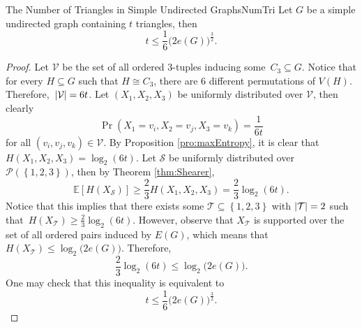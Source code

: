 \documentclass[math]{amznotes}
\theoremstyle{remark}
\begin{document}
\begin{probox}{The Number of Triangles in Simple Undirected Graphs}{NumTri}
    Let $G$ be a simple undirected graph containing $t$ triangles, then 
    \begin{equation*}
        t \leq \frac{1}{6}\bigl(2e\left(G\right)\bigr)^{\frac{3}{2}}.
    \end{equation*}
    \tcblower
    \begin{proof}
        Let $\mathcal{V}$ be the set of all ordered $3$-tuples inducing some~$C_3 \subseteq G$. Notice that for every $H \subseteq G$ such that $H \cong C_3$, there are $6$ different permutations of $V\left(H\right)$. Therefore,~${\left\lvert {\mathcal{V}} \right\rvert} = 6t$. Let $\left(X_1, X_2, X_3\right)$ be uniformly distributed over $\mathcal{V}$, then clearly 
        \begin{equation*}
            \Pr\left(X_1 = v_i, X_2 = v_j, X_3 = v_k\right) = \frac{1}{6t}
        \end{equation*}
        for all $\left(v_i, v_j, v_k\right) \in \mathcal{V}$. By Proposition \ref{pro:maxEntropy}, it is clear that $H\left(X_1, X_2, X_3\right) = \log_2\left(6t\right)$. Let $\mathcal{S}$ be uniformly distributed over $\mathcal{P}\left(\left\{1, 2, 3\right\}\right)$, then by Theorem \ref{thm:Shearer}, 
        \begin{equation*}
            \mathbb{E}\left[H\left(X_{\mathcal{S}}\right)\right] \geq \frac{2}{3}H\left(X_1, X_2, X_3\right) = \frac{2}{3}\log_2\left(6t\right).
        \end{equation*}
        Notice that this implies that there exists some $\mathcal{T} \subseteq \left\{1, 2, 3\right\}$ with ${\left\lvert {\mathcal{T}} \right\rvert} = 2$ such that~$H\left(X_{\mathcal{T}}\right) \geq \frac{2}{3}\log_2\left(6t\right)$. However, observe that $X_{\mathcal{T}}$ is supported over the set of all ordered pairs induced by $E\left(G\right)$, which means that $H\left(X_{\mathcal{T}}\right) \leq \log_2\bigl(2e\left(G\right)\bigr)$. Therefore, 
        \begin{equation*}
            \frac{2}{3}\log_2\left(6t\right) \leq \log_2\bigl(2e\left(G\right)\bigr).
        \end{equation*}
        One may check that this inequality is equivalent to 
        \begin{equation*}
            t \leq \frac{1}{6}\bigl(2e\left(G\right)\bigr)^{\frac{3}{2}}.
        \end{equation*}
    \end{proof}
\end{probox}
\end{document}
